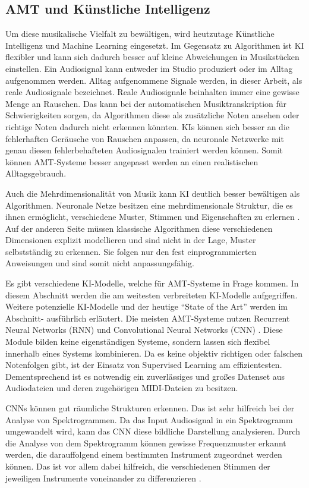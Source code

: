 \subsection{AMT und Künstliche Intelligenz}
Um diese musikalische Vielfalt zu bewältigen, wird heutzutage Künstliche Intelligenz und Machine Learning eingesetzt.
Im Gegensatz zu Algorithmen ist KI flexibler und kann sich dadurch besser
auf kleine Abweichungen in Musikstücken einstellen.
Ein Audiosignal kann entweder im Studio produziert oder im Alltag aufgenommen werden.
Alltag aufgenommene Signale werden, in dieser Arbeit, als reale Audiosignale bezeichnet.
Reale Audiosignale beinhalten immer eine gewisse Menge an Rauschen.
Das kann bei der automatischen Musiktranskription für Schwierigkeiten sorgen,
da Algorithmen diese als zusätzliche Noten ansehen oder richtige Noten dadurch nicht erkennen könnten.
KIs können sich besser an die fehlerhaften Geräusche von Rauschen anpassen,
da neuronale Netzwerke mit genau diesen fehlerbehafteten Audiosignalen trainiert werden können.
Somit können AMT-Systeme besser angepasst werden an einen realistischen Alltagsgebrauch.

Auch die Mehrdimensionalität von Musik kann KI deutlich besser bewältigen als Algorithmen.
Neuronale Netze besitzen eine mehrdimensionale Struktur, die es ihnen ermöglicht,
verschiedene Muster, Stimmen und Eigenschaften zu erlernen \cite{graves2007multi}.
Auf der anderen Seite müssen klassische Algorithmen diese verschiedenen Dimensionen
explizit modellieren und sind nicht in der Lage, Muster selbstständig zu erkennen.
Sie folgen nur den fest einprogrammierten Anweisungen und sind somit nicht anpassungsfähig.

Es gibt verschiedene KI-Modelle, welche für AMT-Systeme in Frage kommen.
In diesem Abschnitt werden die am weitesten verbreiteten KI-Modelle aufgegriffen.
Weitere potenzielle KI-Modelle und der heutige
\enquote{State of the Art} werden im Abschnitt- ausführlich erläutert.
Die meisten AMT-Systeme nutzen Recurrent Neural Networks (RNN) und Convolutional Neural Networks (CNN) \cite{Boeck2012}.
Diese Module bilden keine eigenständigen Systeme, sondern lassen sich flexibel innerhalb eines Systems kombinieren.
Da es keine objektiv richtigen oder falschen Notenfolgen gibt, ist der Einsatz von Supervised Learning am effizientesten.
Dementsprechend ist es notwendig ein zuverlässiges und großes Datenset aus Audiodateien und deren zugehörigen MIDI-Dateien zu besitzen.

CNNs können gut räumliche Strukturen erkennen.
Das ist sehr hilfreich bei der Analyse von Spektrogrammen.
Da das Input Audiosignal in ein Spektrogramm umgewandelt wird,
kann das CNN diese bildliche Darstellung analysieren.
Durch die Analyse von dem Spektrogramm können gewisse Frequenzmuster erkannt werden,
die darauffolgend einem bestimmten Instrument zugeordnet werden können.
Das ist vor allem dabei hilfreich, die verschiedenen Stimmen der jeweiligen Instrumente voneinander zu differenzieren \cite{han2016deep}.


